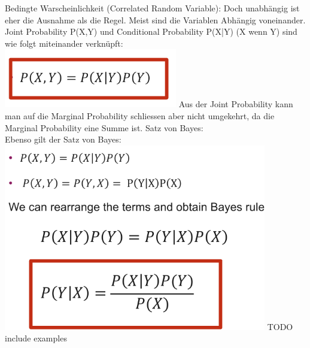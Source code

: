 \textcolor{myblue}{Bedingte Warscheinlichkeit (Correlated Random Variable):}
Doch unabhängig ist eher die Ausnahme als die Regel. Meist sind die Variablen Abhängig voneinander. \\
Joint Probability P(X,Y) und Conditional Probability P(X|Y) (X wenn Y) sind wie folgt miteinander verknüpft:\\
\includegraphics[width=\linewidth]{img/correlated_random_variable.png}
Aus der Joint Probability kann man auf die Marginal Probability schliessen aber nicht umgekehrt, da die Marginal Probability eine Summe ist.
\textcolor{myblue}{Satz von Bayes:}\\
Ebenso gilt der Satz von Bayes:\\
\includegraphics[width=\linewidth]{img/bayes.png}
TODO include examples